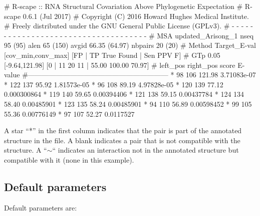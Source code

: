 \begin{sreoutput}
# R-scape :: RNA Structural Covariation Above Phylogenetic Expectation
# R-scape 0.6.1 (Jul 2017)
# Copyright (C) 2016 Howard Hughes Medical Institute.
# Freely distributed under the GNU General Public License (GPLv3).
# - - - - - - - - - - - - - - - - - - - - - - - - - - - - - - - - - - - -
# MSA updated_Arisong_1 nseq 95 (95) alen 65 (150) avgid 66.35 (64.97) nbpairs 20 (20)
# Method Target_E-val [cov_min,conv_max] [FP | TP True Found | Sen PPV F] 
# GTp    0.05         [-9.64,121.98]     [0 | 11 20 11 | 55.00 100.00 70.97] 
#       left_pos       right_pos        score   E-value
#------------------------------------------------------------
*	      98	     106	121.98	3.71083e-07
*	     122	     137	95.92	1.81573e-05
*	      96	     108	89.19	4.97828e-05
*	     120	     139	77.12	0.000300864
*	     119	     140	59.65	0.00394406
*	     121	     138	59.15	0.00437784
*	     124	     134	58.40	0.00485901
*	     123	     135	58.24	0.00485901
*	      94	     110	56.89	0.00598452
*	      99	     105	55.36	0.00776149
*	      97	     107	52.27	0.0117527
\end{sreoutput}
A star ``*'' in the first column indicates that the pair is part of
the annotated structure in the  file. A
blank indicates a pair that is not compatible with the structure. A
``$\sim$`` indicates an interaction not in the annotated structure but
compatible with it (none in this example).

\subsection{Default parameters}

Default parameters are:

